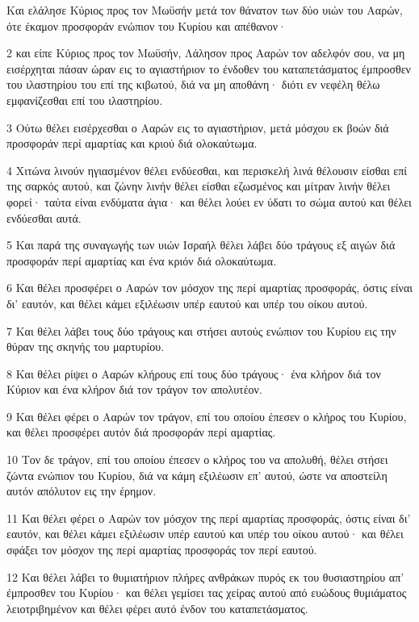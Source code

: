 \par Και ελάλησε Κύριος προς τον Μωϋσήν μετά τον θάνατον των δύο υιών του Ααρών, ότε έκαμον προσφοράν ενώπιον του Κυρίου και απέθανον·
\par 2 και είπε Κύριος προς τον Μωϋσήν, Λάλησον προς Ααρών τον αδελφόν σου, να μη εισέρχηται πάσαν ώραν εις το αγιαστήριον το ένδοθεν του καταπετάσματος έμπροσθεν του ιλαστηρίου του επί της κιβωτού, διά να μη αποθάνη· διότι εν νεφέλη θέλω εμφανίζεσθαι επί του ιλαστηρίου.
\par 3 Ούτω θέλει εισέρχεσθαι ο Ααρών εις το αγιαστήριον, μετά μόσχου εκ βοών διά προσφοράν περί αμαρτίας και κριού διά ολοκαύτωμα.
\par 4 Χιτώνα λινούν ηγιασμένον θέλει ενδύεσθαι, και περισκελή λινά θέλουσιν είσθαι επί της σαρκός αυτού, και ζώνην λινήν θέλει είσθαι εζωσμένος και μίτραν λινήν θέλει φορεί· ταύτα είναι ενδύματα άγια· και θέλει λούει εν ύδατι το σώμα αυτού και θέλει ενδύεσθαι αυτά.
\par 5 Και παρά της συναγωγής των υιών Ισραήλ θέλει λάβει δύο τράγους εξ αιγών διά προσφοράν περί αμαρτίας και ένα κριόν διά ολοκαύτωμα.
\par 6 Και θέλει προσφέρει ο Ααρών τον μόσχον της περί αμαρτίας προσφοράς, όστις είναι δι' εαυτόν, και θέλει κάμει εξιλέωσιν υπέρ εαυτού και υπέρ του οίκου αυτού.
\par 7 Και θέλει λάβει τους δύο τράγους και στήσει αυτούς ενώπιον του Κυρίου εις την θύραν της σκηνής του μαρτυρίου.
\par 8 Και θέλει ρίψει ο Ααρών κλήρους επί τους δύο τράγους· ένα κλήρον διά τον Κύριον και ένα κλήρον διά τον τράγον τον απολυτέον.
\par 9 Και θέλει φέρει ο Ααρών τον τράγον, επί του οποίου έπεσεν ο κλήρος του Κυρίου, και θέλει προσφέρει αυτόν διά προσφοράν περί αμαρτίας.
\par 10 Τον δε τράγον, επί του οποίου έπεσεν ο κλήρος του να απολυθή, θέλει στήσει ζώντα ενώπιον του Κυρίου, διά να κάμη εξιλέωσιν επ' αυτού, ώστε να αποστείλη αυτόν απόλυτον εις την έρημον.
\par 11 Και θέλει φέρει ο Ααρών τον μόσχον της περί αμαρτίας προσφοράς, όστις είναι δι' εαυτόν, και θέλει κάμει εξιλέωσιν υπέρ εαυτού και υπέρ του οίκου αυτού· και θέλει σφάξει τον μόσχον της περί αμαρτίας προσφοράς τον περί εαυτού.
\par 12 Και θέλει λάβει το θυμιατήριον πλήρες ανθράκων πυρός εκ του θυσιαστηρίου απ' έμπροσθεν του Κυρίου· και θέλει γεμίσει τας χείρας αυτού από ευώδους θυμιάματος λειοτριβημένον και θέλει φέρει αυτό ένδον του καταπετάσματος.

